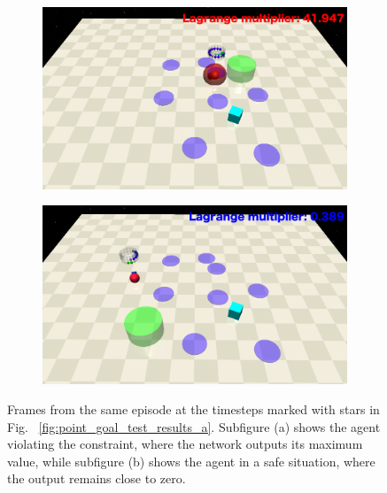 \begin{figure}[H]
    \centering
    \begin{subfigure}{0.48\textwidth}
        \centering
        \includegraphics[width=\linewidth]{figure/test/unsafe.png}
        \caption{}
    \end{subfigure}
    \hfill
    \begin{subfigure}{0.49\textwidth}
        \centering
        \includegraphics[width=\linewidth]{figure/test/safe.png}
        \caption{}
    \end{subfigure}
    \caption{Frames from the same episode at the timesteps marked with stars in Fig. ~\ref{fig:point_goal_test_results_a}. 
            Subfigure (a) shows the agent violating the constraint, where the network outputs its maximum value, 
            while subfigure (b) shows the agent in a safe situation, where the output remains close to zero.}
    \label{fig:point_goal_test_results_bc}
\end{figure}

